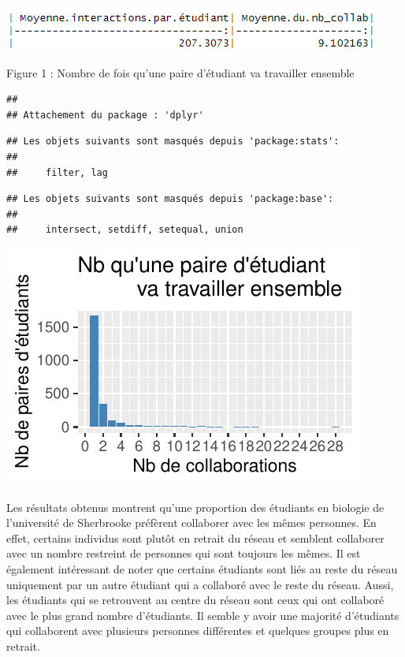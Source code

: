 \documentclass[9pt,twocolumn,twoside,]{pnas-new}
\begin{document}
\includegraphics[width=1\linewidth]{moyenne}

Figure 1 : Nombre de fois qu'une paire d'étudiant va travailler ensemble

\begin{verbatim}
## 
## Attachement du package : 'dplyr'
\end{verbatim}

\begin{verbatim}
## Les objets suivants sont masqués depuis 'package:stats':
## 
##     filter, lag
\end{verbatim}

\begin{verbatim}
## Les objets suivants sont masqués depuis 'package:base':
## 
##     intersect, setdiff, setequal, union
\end{verbatim}

\includegraphics{Rmarkdown_Reseau_Ecologique_files/figure-latex/unnamed-chunk-4-1.pdf}

Les résultats obtenus montrent qu'une proportion des étudiants en
biologie de l'université de Sherbrooke préfèrent collaborer avec les
mêmes personnes. En effet, certains individus sont plutôt en retrait du
réseau et semblent collaborer avec un nombre restreint de personnes qui
sont toujours les mêmes. Il est également intéressant de noter que
certains étudiants sont liés au reste du réseau uniquement par un autre
étudiant qui a collaboré avec le reste du réseau. Aussi, les étudiants
qui se retrouvent au centre du réseau sont ceux qui ont collaboré avec
le plus grand nombre d'étudiants. Il semble y avoir une majorité
d'étudiants qui collaborent avec plusieurs personnes différentes et
quelques groupes plus en retrait.
\end{document}
